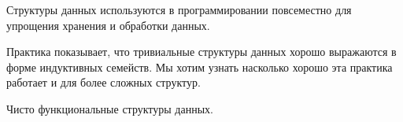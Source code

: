 \startprefacepage

Структуры данных используются в программировании повсеместно для
упрощения хранения и обработки данных.

Практика показывает, что тривиальные структуры данных хорошо выражаются в форме
индуктивных семейств.
Мы хотим узнать насколько хорошо эта практика работает и для более сложных
структур.

\iffalse
hello world 
\newline
\fi
Чисто функциональные структуры данных.

